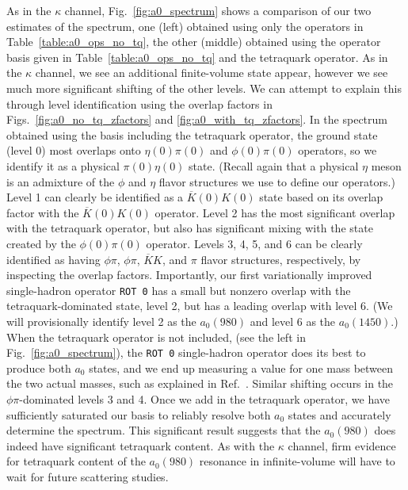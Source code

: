 As in the $\kappa$ channel, Fig.~\ref{fig:a0_spectrum} shows a comparison of our two estimates of the spectrum, one (left) obtained using only the operators in Table~\ref{table:a0_ops_no_tq}, the other (middle) obtained using the operator basis given in Table~\ref{table:a0_ops_no_tq} and the tetraquark operator. As in the $\kappa$ channel, we see an additional finite-volume state appear, however we see much more significant shifting of the other levels. We can attempt to explain this through level identification using the overlap factors in Figs.~\ref{fig:a0_no_tq_zfactors} and \ref{fig:a0_with_tq_zfactors}. In the spectrum obtained using the basis including the tetraquark operator, the ground state (level 0) most overlaps onto $\eta(0)\pi(0)$ and $\phi(0)\pi(0)$ operators, so we identify it as a physical $\pi(0)\eta(0)$ state. (Recall again that a physical $\eta$ meson is an admixture of the $\phi$ and $\eta$ flavor structures we use to define our operators.) Level 1 can clearly be identified as a $\overline K(0) K(0)$ state based on its overlap factor with the $\overline K(0) K(0)$ operator. Level 2 has the most significant overlap with the tetraquark operator, but also has significant mixing with the state created by the $\phi(0)\pi(0)$ operator. Levels 3, 4, 5, and 6 can be clearly identified as having $\phi\pi$, $\phi\pi$, $\overline K K$, and $\pi$ flavor structures, respectively, by inspecting the overlap factors. Importantly, our first variationally improved single-hadron operator \verb+ROT 0+ has a small but nonzero overlap with the tetraquark-dominated state, level 2, but has a leading overlap with level 6. (We will provisionally identify level 2 as the $a_0(980)$ and level 6 as the $a_0(1450)$.) When the tetraquark operator is not included, (see the left in Fig.~\ref{fig:a0_spectrum}), the \verb+ROT 0+ single-hadron operator does its best to produce both $a_0$ states, and we end up measuring a value for one mass between the two actual masses, such as explained in Ref.~\cite{Dudek:2012xn}. Similar shifting occurs in the $\phi\pi$-dominated levels 3 and 4. Once we add in the tetraquark operator, we have sufficiently saturated our basis to reliably resolve both $a_0$ states and accurately determine the spectrum. This significant result suggests that the $a_0(980)$ does indeed have significant tetraquark content. As with the $\kappa$ channel, firm evidence for tetraquark content of the $a_0(980)$ resonance in infinite-volume will have to wait for future scattering studies.



